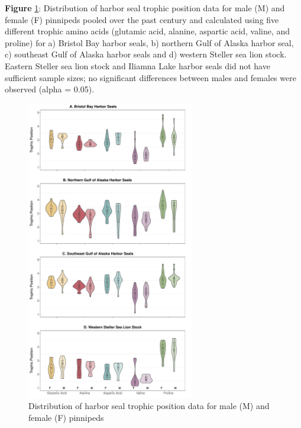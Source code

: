 \documentclass [11pt, proquest] {uwthesis}[2015/03/03]
\begin{document}
\textbf{Figure} \ref{fig:sex4}: Distribution of harbor seal trophic
position data for male (M) and female (F) pinnipeds pooled over the past
century and calculated using five different trophic amino acids
(glutamic acid, alanine, aspartic acid, valine, and proline) for a)
Bristol Bay harbor seals, b) northern Gulf of Alaska harbor seal, c)
southeast Gulf of Alaska harbor seals and d) western Steller sea lion
stock. Eastern Steller sea lion stock and Iliamna Lake harbor seals did
not have sufficient sample sizes; no significant differences between
males and females were observed (alpha = 0.05). \newline 
\begin{figure}[h]
\centering
  \includegraphics[width=0.65\textwidth]{figure/Ch4/Figure3.pdf}
  \caption{Distribution of harbor seal trophic position data for male (M) and female (F) pinnipeds}
  \label{fig:sex4}
\end{figure}
\clearpage
\end{document}
